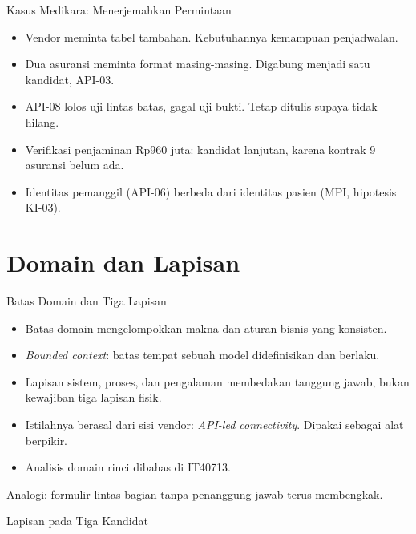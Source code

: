 \documentclass[aspectratio=169, table, 12pt]{beamer}
\begin{document}
\begin{frame}{{\Large Kasus Medikara: Menerjemahkan Permintaan}}
  \vspace{8pt}
  \begin{itemize}
    \item Vendor meminta tabel tambahan. Kebutuhannya kemampuan penjadwalan.
    \item Dua asuransi meminta format masing-masing. Digabung menjadi satu kandidat, API-03.
    \item API-08 lolos uji lintas batas, gagal uji bukti. Tetap ditulis supaya tidak hilang.
    \item Verifikasi penjaminan Rp960 juta: kandidat lanjutan, karena kontrak 9 asuransi belum ada.
    \item Identitas pemanggil (API-06) berbeda dari identitas pasien (MPI, hipotesis KI-03).
  \end{itemize}
\end{frame}

\section{Domain dan Lapisan}

\begin{frame}{{\Large Batas Domain dan Tiga Lapisan}}
  \vspace{8pt}
  \begin{itemize}
    \item Batas domain mengelompokkan makna dan aturan bisnis yang konsisten.
    \item \textit{Bounded context}: batas tempat sebuah model didefinisikan dan berlaku.
    \item Lapisan sistem, proses, dan pengalaman membedakan tanggung jawab, bukan kewajiban tiga lapisan fisik.
    \item Istilahnya berasal dari sisi vendor: \textit{API-led connectivity}. Dipakai sebagai alat berpikir.
    \item Analisis domain rinci dibahas di IT40713.
  \end{itemize}
  \vspace{6pt}
  {\small Analogi: formulir lintas bagian tanpa penanggung jawab terus membengkak.}
\end{frame}

\begin{frame}{{\Large Lapisan pada Tiga Kandidat}}
  \centering
\end{frame}
\end{document}
